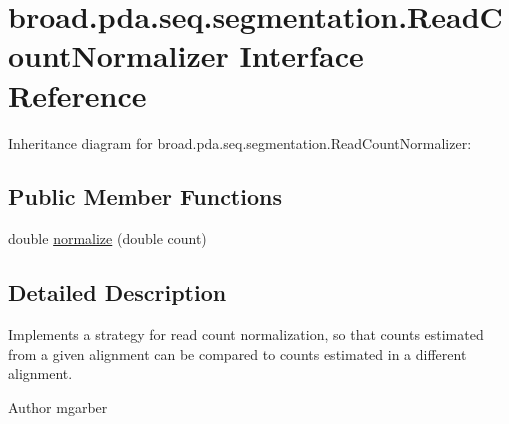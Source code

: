 \hypertarget{interfacebroad_1_1pda_1_1seq_1_1segmentation_1_1_read_count_normalizer}{\section{broad.\+pda.\+seq.\+segmentation.\+Read\+Count\+Normalizer Interface Reference}
\label{interfacebroad_1_1pda_1_1seq_1_1segmentation_1_1_read_count_normalizer}
}


Inheritance diagram for broad.\+pda.\+seq.\+segmentation.\+Read\+Count\+Normalizer\+:
\subsection*{Public Member Functions}
\begin{DoxyCompactItemize}
\item 
double \hyperlink{interfacebroad_1_1pda_1_1seq_1_1segmentation_1_1_read_count_normalizer_a0d916434c0e40aa3d37e2c19948410ac}{normalize} (double count)
\end{DoxyCompactItemize}


\subsection{Detailed Description}
Implements a strategy for read count normalization, so that counts estimated from a given alignment can be compared to counts estimated in a different alignment. \begin{DoxyAuthor}{Author}
mgarber 
\end{DoxyAuthor}


